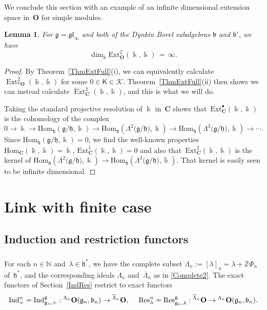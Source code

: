 \documentclass[11pt]{amsart}
\newcommand{\cK}{\mathcal{K}}
\newcommand{\KKK}{\mathsf{K}}
\newcommand{\rR}{\Phi}
\newcommand{\bO}{\mathbf{O}}
\newcommand{\bC}{\mathbf{C}}
\newcommand{\Hom}{\mathrm{Hom}}
\newcommand{\Ext}{\mathrm{Ext}}
\newcommand{\mk}{\Bbbk}
\newcommand{\fg}{\mathfrak{g}}
\newcommand{\fq}{\mathfrak{q}}
\newcommand{\fv}{\mathfrak{v}}
\newcommand{\fh}{\mathfrak{h}}
\newcommand{\fb}{\mathfrak{b}}
\newcommand{\mN}{\mathbb{N}}
\newcommand{\mZ}{\mathbb{Z}}
\numberwithin{equation}{section}
\theoremstyle{plain}
\newtheorem{lemma}[subsubsection]{Lemma}
\theoremstyle{remark}
\theoremstyle{remark}
\theoremstyle{construction}
\newcommand{\ind}{{\rm Ind}}
\newcommand{\res}{{\rm Res}}
\begin{document}
We conclude this section with an example of an infinite dimensional extension space in~$\bO$ for simple modules.
\begin{lemma}
For $\fg=\mathfrak{gl}_{\infty}$ and both of the Dynkin Borel subalgebras {$\fb$ and $\fb'$}, we have
$$\dim_{\mk}\Ext^2_{\bO}(\mk,\mk)\,=\,\infty.$$
\end{lemma}
\begin{proof}
{By} Theorem~\ref{ThmExtFull}(i){,} we can equivalently calculate  {$\operatorname{Ext}^2_{{}^{\KKK}\bO}(\mk,\mk)$} for some $0\in\KKK\in\cK$. Theorem~\ref{ThmExtFull}(ii) then shows we can {instead} calculate  {$\operatorname{Ext}^2_{\bC}(\mk,\mk)$}{, and this {is} what we will do.}

 Taking the standard projective resolution of $\mk$ in~$\bC$ shows that~$\Ext^\bullet_{{\bC}}(\mk,\mk)$ is the cohomology of the complex
$$0\to\mk \to \Hom_{\fh}(\fg/\fh,\mk)\to \Hom_{\fh}(\Lambda^2{(}\fg/\fh{)},\mk)\to  \Hom_{\fh}(\Lambda^3{(}\fg/\fh{)},\mk)\to\cdots.$$ 
Since $\Hom_{\fh}(\fg/\fh,\mk)=0$, we find the well-known properties $\Hom_{\bC}(\mk,\mk)=\mk$, $\Ext^1_{{\bC}}(\mk,\mk)=0$ and also that~$\Ext^2_{{\bC}}(\mk,\mk)$ is the kernel of $ \Hom_{\fh}(\Lambda^2{(}\fg/\fh{)},\mk)\to  \Hom_{\fh}(\Lambda^3{(}\fg/\fh{)},\mk)$. That kernel is easily seen to be infinite dimensional.
\end{proof}


\section{Link with finite case}

\subsection{Induction and restriction functors}


\subsubsection{} For each $n\in\mN$ and~$\lambda\in\fh^\ast$, we have the complete {sub}set $\Lambda_n:=[\lambda]_n=\lambda+\mZ\rR_n$ {of}~$\fh^\ast${, and} the corresponding ideals $\mathring{\Lambda}_n$ and~$\overline{\Lambda}_n$ as in \ref{Complete2}.
The exact functors of Section~\ref{IndRes} restrict to exact functors
$$\ind^{n}_+=\ind^{\fg}_{\fg_n,+}:{}^{\Lambda_n}\bO(\fg_n,\fb_n)\to{}^{\overline{\Lambda}_n}\bO,\;\quad \res^n_\lambda=\res^{\fg}_{\fg_n,\lambda}: {}^{\overline{\Lambda}_n}\bO\to {}^{\Lambda_n}\bO(\fg_n,\fb_n).$$
\end{document}
